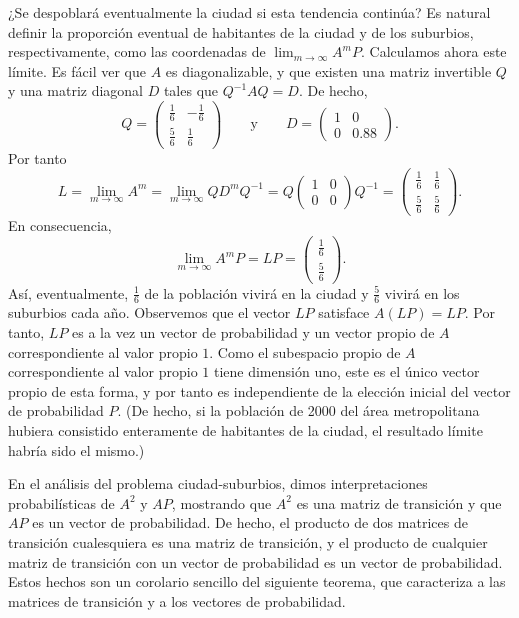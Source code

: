 \documentclass[12pt,a4paper]{book}
\begin{document}
    ¿Se despoblará eventualmente la ciudad si esta tendencia continúa? Es natural definir la proporción eventual de habitantes de la ciudad y de los suburbios, respectivamente, como las coordenadas de $\lim_{m\to\infty}A^mP$. Calculamos ahora este límite. Es fácil ver que $A$ es diagonalizable, y que existen una matriz invertible $Q$ y una matriz diagonal $D$ tales que $Q^{-1}AQ=D$. De hecho,
    \begin{equation*}
        Q=\begin{pmatrix}\frac16&-\frac16\\\frac56&\frac16\end{pmatrix} \qquad\text{y}\qquad D=\begin{pmatrix}1&0\\0&0.88\end{pmatrix}.
    \end{equation*}
    Por tanto
    \begin{equation*}
        L=\lim_{m\to\infty}A^m=\lim_{m\to\infty}QD^mQ^{-1}=Q\begin{pmatrix}1&0\\0&0\end{pmatrix}Q^{-1}=\begin{pmatrix}\frac16&\frac16\\\frac56&\frac56\end{pmatrix}.
    \end{equation*}
    En consecuencia,
    \begin{equation*}
        \lim_{m\to\infty}A^mP=LP=\begin{pmatrix}\frac16\\\frac56\end{pmatrix}.
    \end{equation*}
    Así, eventualmente, $\frac16$ de la población vivirá en la ciudad y $\frac56$ vivirá en los suburbios cada año. Observemos que el vector $LP$ satisface $A(LP)=LP$. Por tanto, $LP$ es a la vez un vector de probabilidad y un vector propio de $A$ correspondiente al valor propio $1$. Como el subespacio propio de $A$ correspondiente al valor propio $1$ tiene dimensión uno, este es el único vector propio de esta forma, y por tanto es independiente de la elección inicial del vector de probabilidad $P$. (De hecho, si la población de 2000 del área metropolitana hubiera consistido enteramente de habitantes de la ciudad, el resultado límite habría sido el mismo.)

    En el análisis del problema ciudad-suburbios, dimos interpretaciones probabilísticas de $A^2$ y $AP$, mostrando que $A^2$ es una matriz de transición y que $AP$ es un vector de probabilidad. De hecho, el producto de dos matrices de transición cualesquiera es una matriz de transición, y el producto de cualquier matriz de transición con un vector de probabilidad es un vector de probabilidad. Estos hechos son un corolario sencillo del siguiente teorema, que caracteriza a las matrices de transición y a los vectores de probabilidad.
\end{document}
